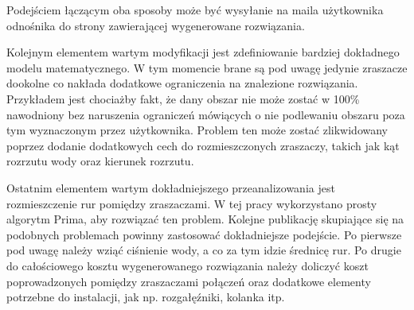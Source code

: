 \documentclass[twoside]{iisthesis}
\begin{document}
Podejściem łączącym oba sposoby może być wysyłanie na maila użytkownika odnośnika do strony zawierającej wygenerowane rozwiązania.

Kolejnym elementem wartym modyfikacji jest zdefiniowanie bardziej dokładnego modelu matematycznego. W tym momencie brane są pod uwagę jedynie zraszacze dookolne co nakłada dodatkowe ograniczenia na znalezione rozwiązania. Przykładem jest chociażby fakt, że dany obszar nie może zostać w 100\% nawodniony bez naruszenia ograniczeń mówiących o nie podlewaniu obszaru poza tym wyznaczonym przez użytkownika. Problem ten może zostać zlikwidowany poprzez dodanie dodatkowych cech do rozmieszczonych zraszaczy, takich jak kąt rozrzutu wody oraz kierunek rozrzutu.

Ostatnim elementem wartym dokładniejszego przeanalizowania jest rozmieszczenie rur pomiędzy zraszaczami. W tej pracy wykorzystano prosty algorytm Prima, aby rozwiązać ten problem. Kolejne publikację skupiające się na podobnych problemach powinny zastosować dokładniejsze podejście. Po pierwsze pod uwagę należy wziąć ciśnienie wody, a co za tym idzie średnicę rur. Po drugie do całościowego kosztu wygenerowanego rozwiązania należy doliczyć koszt poprowadzonych pomiędzy zraszaczami połączeń oraz dodatkowe elementy potrzebne do instalacji, jak np. rozgałęźniki, kolanka itp.



\end{document}
